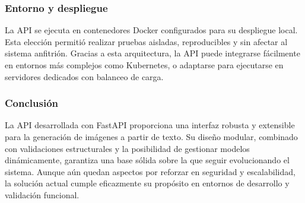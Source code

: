 \subsubsection{Entorno y despliegue}

La API se ejecuta en contenedores Docker configurados para su despliegue local. Esta elección permitió realizar pruebas aisladas, reproducibles y sin afectar al sistema anfitrión. Gracias a esta arquitectura, la API puede integrarse fácilmente en entornos más complejos como Kubernetes, o adaptarse para ejecutarse en servidores dedicados con balanceo de carga.

\subsubsection{Conclusión}
La API desarrollada con FastAPI proporciona una interfaz robusta y extensible para la generación de imágenes a partir de texto. Su diseño modular, combinado con validaciones estructurales y la posibilidad de gestionar modelos dinámicamente, garantiza una base sólida sobre la que seguir evolucionando el sistema. Aunque aún quedan aspectos por reforzar en seguridad y escalabilidad, la solución actual cumple eficazmente su propósito en entornos de desarrollo y validación funcional.